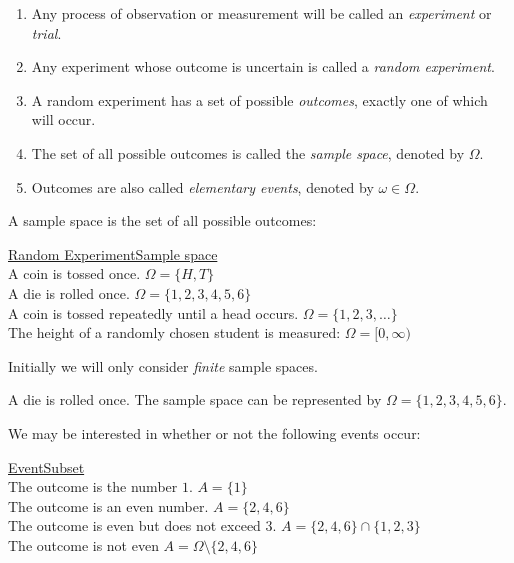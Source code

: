 \documentclass[lecture]{csm}
\def\it{\item}
\def\ben{\begin{enumerate}}
\def\een{\end{enumerate}}
\begin{document}
\begin{definition}
\ben
\it
Any process of observation or measurement will be called an \emph{experiment} or \emph{trial}.
\it
Any experiment whose outcome is uncertain is called a \emph{random experiment}.
\it
A random experiment has a set of possible \emph{outcomes}, exactly one of which will occur.
\it
The set of all possible outcomes is called the \emph{sample space}, denoted by $\Omega$.
\it
Outcomes are also called \emph{elementary events}, denoted by $\omega\in\Omega$.
\een
\end{definition}

\break %

\begin{example}
A sample space is the set of all possible outcomes:
\begin{tabbing}
\underline{Random Experiment}\qquad\qquad\qquad\qquad\qquad\qquad\qquad\qquad\qquad \= \underline{Sample space} \\ 
A coin is tossed once.	\> $\Omega = \{H,T\}$ \\
A die is rolled once.	\> $\Omega=\{1,2,3,4,5,6\}$ \\
A coin is tossed repeatedly until a head occurs. \> $\Omega = \{1,2,3,\ldots\}$ \\
The height of a randomly chosen student is measured: \> $\Omega = [0,\infty)$
\end{tabbing}
\end{example}
\begin{remark}
Initially we will only consider \emph{finite} sample spaces. 
\end{remark}

\begin{example}
A die is rolled once. The sample space can be represented by $\Omega=\{1,2,3,4,5,6\}$.\par
We may be interested in whether or not the following events occur:
\begin{tabbing}
\underline{Event}\qquad\qquad\qquad\qquad\qquad\qquad\qquad\qquad\qquad\qquad\qquad\qquad\=\underline{Subset} \\ 
The outcome is the number $1$.	\> $A = \{1\}$ \\
The outcome is an even number.	\> $A = \{2,4,6\}$ \\
The outcome is even but does not exceed $3$.	\> $A = \{2,4,6\}\cap\{1,2,3\}$ \\
The outcome is not even			\> $A = \Omega\setminus\{2,4,6\}$
\end{tabbing}
\end{example}
\end{document}

